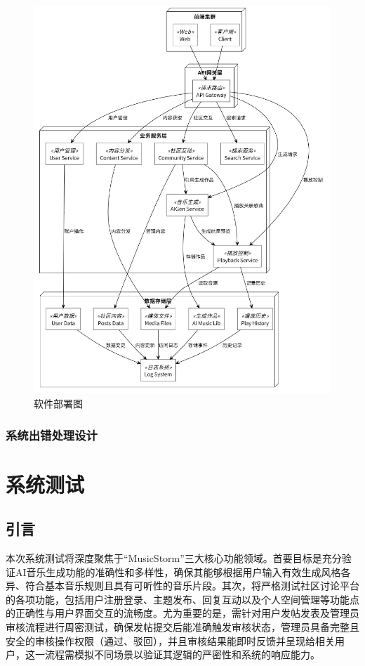 \documentclass{base}
\numberwithin{figure}{section} %
\begin{document}
\begin{figure}[H]
    \centering
    \includegraphics[width=\textwidth]{images/5-13.png}
    \caption{软件部署图}
\end{figure}

\subsubsection{系统出错处理设计}


\newpage

\section{系统测试}

\subsection{引言}

本次系统测试将深度聚焦于“MusicStorm”三大核心功能领域。首要目标是充分验证AI音乐生成功能的准确性和多样性，确保其能够根据用户输入有效生成风格各异、符合基本音乐规则且具有可听性的音乐片段。其次，将严格测试社区讨论平台的各项功能，包括用户注册登录、主题发布、回复互动以及个人空间管理等功能点的正确性与用户界面交互的流畅度。尤为重要的是，需针对用户发帖发表及管理员审核流程进行周密测试，确保发帖提交后能准确触发审核状态，管理员具备完整且安全的审核操作权限（通过、驳回），并且审核结果能即时反馈并呈现给相关用户，这一流程需模拟不同场景以验证其逻辑的严密性和系统的响应能力。
\end{document}
